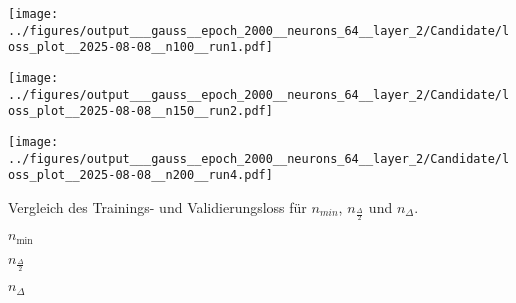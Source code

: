 \begin{otherlanguage}{ngerman}
\begin{samepage}
\begin{minipage}{\textwidth}
\vspace{0.125cm}

\begin{minipage}{0.05\textwidth}\centering{}\end{minipage}%
\begin{minipage}{0.3\textwidth}
    \centering
    \texttt{[image: ../figures/output\_\_\_gauss\_\_epoch\_2000\_\_neurons\_64\_\_layer\_2/Candidate/loss\_plot\_\_2025-08-08\_\_n100\_\_run1.pdf]}
\end{minipage}%
\begin{minipage}{0.3\textwidth}
    \centering
    \texttt{[image: ../figures/output\_\_\_gauss\_\_epoch\_2000\_\_neurons\_64\_\_layer\_2/Candidate/loss\_plot\_\_2025-08-08\_\_n150\_\_run2.pdf]}
\end{minipage}%
\begin{minipage}{0.3\textwidth}
    \centering
    \texttt{[image: ../figures/output\_\_\_gauss\_\_epoch\_2000\_\_neurons\_64\_\_layer\_2/Candidate/loss\_plot\_\_2025-08-08\_\_n200\_\_run4.pdf]}
\end{minipage}

\caption{Vergleich des Trainings- und Validierungsloss für $n_{min}$, $n_{\frac{\Delta}{2}}$ und $n_{\Delta}$.}
\label{fig:matrix_plot}

\begin{minipage}{0.05\textwidth}\vspace{0.5cm}\end{minipage}%
\begin{minipage}{0.3\textwidth}\centering \textbf{$n_{\mathrm{min}}$}\end{minipage}%
\begin{minipage}{0.3\textwidth}\centering \textbf{$n_{\frac{\Delta}{2}}$}\end{minipage}%
\begin{minipage}{0.3\textwidth}\centering \textbf{$n_{\Delta}$}\end{minipage}

\vspace{0.125cm}


\end{minipage}
\end{samepage}
\end{otherlanguage}
